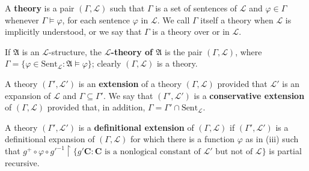 A \textbf{theory} is a pair $(\Gamma, \mathcal{L})$ such that $\Gamma$ is a set of sentences of $\mathcal{L}$ and $\varphi \in \Gamma$ whenever $\Gamma \models \varphi$, for each sentence $\varphi$ in $\mathcal{L}$. We call $\Gamma$ itself a theory when $\mathcal{L}$ is implicitly understood, or we say that $\Gamma$ is a theory over or in $\mathcal{L}$.

If $\mathfrak{A}$ is an $\mathcal{L}$-structure, the \textbf{$\mathcal{L}$-theory of $\mathfrak{A}$} is the pair $(\Gamma, \mathcal{L})$, where $\Gamma = \{\varphi \in \text{Sent}_{\mathcal{L}} : \mathfrak{A} \models \varphi\}$; clearly $(\Gamma, \mathcal{L})$ is a theory.

A theory $(\Gamma', \mathcal{L}')$ is an \textbf{extension} of a theory $(\Gamma, \mathcal{L})$ provided that $\mathcal{L}'$ is an expansion of $\mathcal{L}$ and $\Gamma \subseteq \Gamma'$. We say that $(\Gamma', \mathcal{L}')$ is a \textbf{conservative extension} of $(\Gamma, \mathcal{L})$ provided that, in addition, $\Gamma = \Gamma' \cap \text{Sent}_{\mathcal{L}}$.

A theory $(\Gamma', \mathcal{L}')$ is a \textbf{definitional extension} of $(\Gamma, \mathcal{L})$ if $(\Gamma', \mathcal{L}')$ is a definitional expansion of $(\Gamma, \mathcal{L})$ for which there is a function $\varphi$ as in (iii) such that $g^+ \circ \varphi \circ g'^{-1} \upharpoonright \{g' \mathbf{C} : \mathbf{C} \text{ is a nonlogical constant of } \mathcal{L}' \text{ but not of } \mathcal{L}\}$ is partial recursive.
